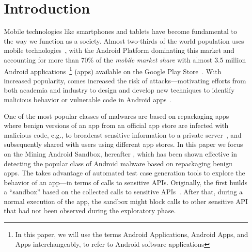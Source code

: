 \section{Introduction}\label{sec:introduction}

Mobile technologies like smartphones and tablets have become fundamental to the way we function as a society. Almost two-thirds of the world population
uses mobile technologies~\cite{Comscore,DBLP:journals/tse/MartinSJZH17}, with the
Android Platform dominating this market and accounting for more than 70\% of the \emph{mobile
market share} with almost 3.5 million Android applications~\footnote{In this paper, we will use the terms Android Applications, Android Apps, and Apps interchangeably, to refer to Android software applications} (apps)
available on the Google Play Store~\cite{Statista}. 
With increased popularity, comes increased the risk of attacks---motivating efforts from both academia and industry to design and develop new techniques
to identify malicious behavior or vulnerable code in Android apps~\cite{10.1145/3017427}.


One of the most popular classes of malwares are based on repackaging apps~\cite{DBLP:conf/wcre/BaoLL18,le2018towards} where benign
versions of an app from an official app store are
infected with malicious code, e.g., to broadcast
sensitive information to a private server~\cite{DBLP:journals/tse/LiBK21}, and subsequently shared
with users using different app stores. In this paper we focus on the Mining Android Sandbox, hereafter \mas, which has been shown effective
in detecting the popular class of Android malware based on 
repackaging benign apps. 
The \mas takes advantage of automated test case generation tools 
to explore the behavior of an app---in terms of calls to sensitive APIs. Originally, the \mas first builds a ``sandbox'' based on the collected calls to sensitive APIs~\cite{DBLP:conf/icse/JamrozikSZ16}. After that, during a normal
execution of the app, the sandbox might block calls to other sensitive API
that had not been observed during the exploratory phase. 


